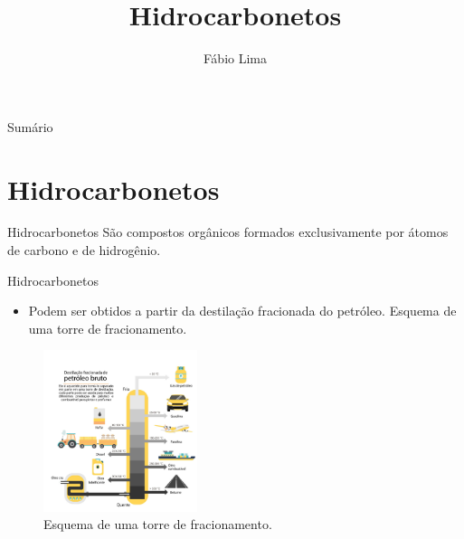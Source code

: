 \documentclass[presentation,professionalfonts,smaller,aspectratio=169]{beamer}
\date{}
\author{Fábio Lima}
\date{}
\title{Hidrocarbonetos}
\begin{document}
\begingroup
  \maketitle
  \endgroup
\begin{frame}{Sumário}
\tableofcontents
\end{frame}




\section{Hidrocarbonetos}
\label{sec:org09df997}
\begin{frame}[label={sec:orge8c56e7}]{Hidrocarbonetos}
São compostos orgânicos formados exclusivamente por átomos de carbono e de hidrogênio.
%
\end{frame}



\begin{frame}[label={sec:org24db5ed}]{Hidrocarbonetos}
\begin{itemize}
\item Podem ser obtidos a partir da destilação fracionada do petróleo. Esquema de uma torre de fracionamento.
\end{itemize}

\begin{figure}[htbp]
\centering
\includegraphics[width=0.4\textwidth]{QO/Hidrocarbonetos/torre.jpg}
\caption{\label{fig:org2463802}Esquema de uma torre de fracionamento.}
\end{figure}
\end{frame}
\end{document}
